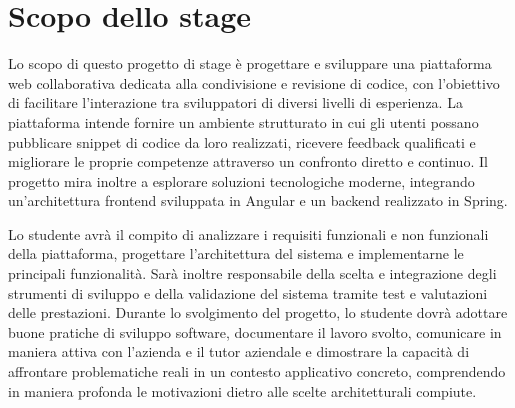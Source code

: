 \section*{Scopo dello stage}
Lo scopo di questo progetto di stage è progettare e sviluppare una piattaforma web collaborativa dedicata alla condivisione e revisione di codice, con l’obiettivo di facilitare l’interazione tra sviluppatori di diversi livelli di esperienza.
La piattaforma intende fornire un ambiente strutturato in cui gli utenti possano pubblicare snippet di codice da loro realizzati, ricevere feedback qualificati e migliorare le proprie competenze attraverso un confronto diretto e continuo. Il progetto mira inoltre a esplorare soluzioni tecnologiche moderne, integrando un'architettura frontend sviluppata in Angular e un backend realizzato in Spring.

\vspace{1em}

Lo studente avrà il compito di analizzare i requisiti funzionali e non funzionali della piattaforma, progettare l'architettura del sistema e implementarne le principali funzionalità. Sarà inoltre responsabile della scelta e integrazione degli strumenti di sviluppo e della validazione del sistema tramite test e valutazioni delle prestazioni. Durante lo svolgimento del progetto, lo studente dovrà adottare buone pratiche di sviluppo software, documentare il lavoro svolto, comunicare in maniera attiva con l'azienda e il tutor aziendale e dimostrare la capacità di affrontare problematiche reali in un contesto applicativo concreto, comprendendo in maniera profonda le motivazioni dietro alle scelte architetturali compiute.

